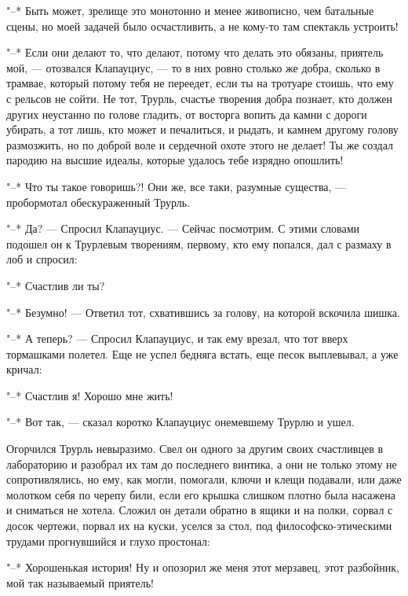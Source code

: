 "--* Быть может, зрелище это монотонно и менее живописно,
чем батальные сцены, но моей задачей было осчастливить, а
не кому-то там спектакль устроить!

"--* Если они  делают то, что делают, потому  что делать это
обязаны, приятель  мой, ---  отозвался Клапауциус, ---  то в
них  ровно  столько же  добра,  сколько  в трамвае,  который
потому тебя не переедет, если ты на тротуаре стоишь, что ему
с рельсов не  сойти. Не тот, Трурль,  счастье творения добра
познает, кто  должен других неустанно по  голове гладить, от
восторга вопить да  камни с дороги убирать, а  тот лишь, кто
может  и  печалиться,  и  рыдать, и  камнем  другому  голову
размозжить, но  по доброй  воле и  сердечной охоте  этого не
делает!  Ты  же создал  пародию  на  высшие идеалы,  которые
удалось тебе изрядно опошлить!

"--* Что ты такое говоришь?! Они же, все таки, разумные
существа, --- пробормотал обескураженный Трурль.

"--* Да? --- Спросил Клапауциус. --- Сейчас посмотрим. С
этими словами подошел он к Трурлевым творениям, первому, кто
ему попался, дал с размаху в лоб и спросил:

"--* Счастлив ли ты?

"--* Безумно! --- Ответил тот, схватившись за голову, на
которой вскочила шишка.

"--* А теперь? --- Спросил Клапауциус, и так ему врезал, что
тот вверх тормашками полетел. Еще не успел бедняга встать,
еще песок выплевывал, а уже кричал:

"--* Счастлив я! Хорошо мне жить!

"--* Вот так, --- сказал коротко Клапауциус онемевшему
Трурлю и ушел.

Огорчился Трурль невыразимо. Свел он одного за другим
своих счастливцев в лабораторию и разобрал их там до
последнего винтика, а они не только этому не сопротивлялись,
но ему, как могли, помогали, ключи и клещи подавали, или
даже молотком себя по черепу били, если его крышка слишком
плотно была насажена и сниматься не хотела. Сложил он детали
обратно в ящики и на полки, сорвал с досок чертежи, порвал
их на куски, уселся за стол, под философско-этическими
трудами прогнувшийся и глухо простонал:

"--* Хорошенькая история! Ну и опозорил же меня этот
мерзавец, этот разбойник, мой так называемый приятель!

